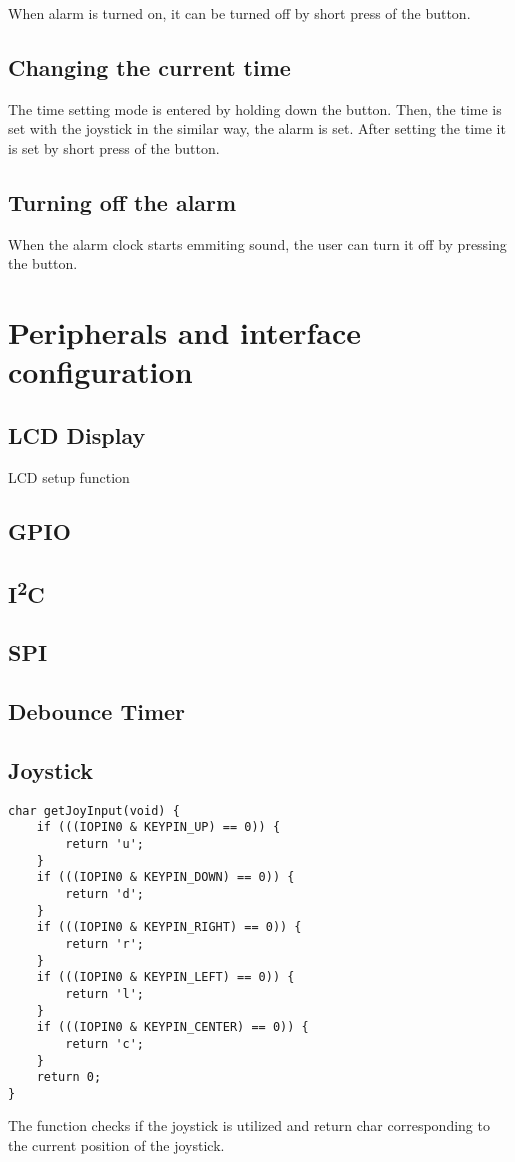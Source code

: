 \documentclass[11pt]{article}
\newcommand{\code}[3]{}
\begin{document}
    When alarm is turned on, it can be turned off by short press of the button.

    \subsection{Changing the current time}
    The time setting mode is entered by holding down the button.
    Then, the time is set with the joystick in the similar way, the alarm is set.
    After setting the time it is set by short press of the button.

    \subsection{Turning off the alarm}
    When the alarm clock starts emmiting sound, the user can turn it off by pressing the button.

    \section{Peripherals and interface configuration}
    \subsection{LCD Display}
    \begin{program}[h]
        \code{63}{96}{display.h}
        \caption{LCD setup function}
    \end{program}

    \subsection{GPIO}

    \subsection{I\textsuperscript{2}C}

    \subsection{SPI}

    \subsection{Debounce Timer}
    
    \subsection{Joystick}
    	\begin{lstlisting}[caption = {Joystick get input function}]
char getJoyInput(void) {
    if (((IOPIN0 & KEYPIN_UP) == 0)) {
		return 'u';
	}
	if (((IOPIN0 & KEYPIN_DOWN) == 0)) {
		return 'd';
	}
	if (((IOPIN0 & KEYPIN_RIGHT) == 0)) {
		return 'r';
	}
	if (((IOPIN0 & KEYPIN_LEFT) == 0)) {
		return 'l';
	}
	if (((IOPIN0 & KEYPIN_CENTER) == 0)) {
		return 'c';
	}
    return 0;
}
	\end{lstlisting}
	The function checks if the joystick is utilized and return char corresponding to the current position of the joystick.
\end{document}
